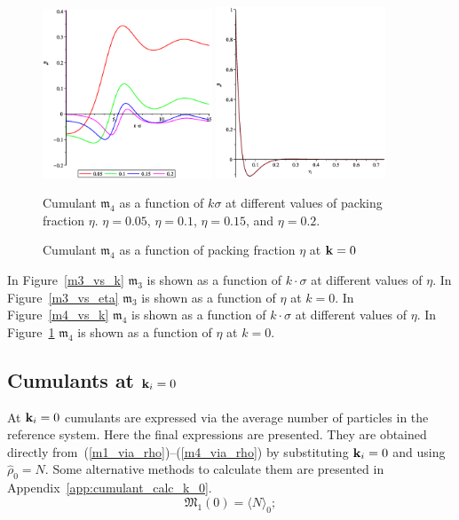 \begin{figure}[htbp]
	\includegraphics[width=0.45\textwidth,angle=0]{M4_as_function_of_k_at_different_eta} \hfill
	\includegraphics[width=0.45\textwidth,angle=0]{M4_as_function_of_eta_at_k_equals_0} \\
	\parbox{0.5\textwidth}{\caption{\label{m4_vs_k} Cumulant $\mathfrak{m}_4$ as a function of $k\sigma$ at different values of packing fraction $\eta$. $\eta = 0.05$, $\eta=0.1$, $\eta = 0.15$, and $\eta=0.2$.
	}} \hfill
	\parbox{0.45\textwidth}{\caption{\label{m4_vs_eta} Cumulant $\mathfrak{m}_4$ as a function of packing fraction $\eta$ at $\vb k = 0$
	}}
\end{figure}
In Figure~\ref{m3_vs_k} $\mathfrak{m}_3$ is shown as a function of $k\cdot\sigma$ at different values of $\eta$. In Figure~\ref{m3_vs_eta} $\mathfrak{m}_3$ is shown as a function of $\eta$ at $k=0$.
In Figure~\ref{m4_vs_k} $\mathfrak{m}_4$ is shown as a function of $k\cdot\sigma$ at different values of $\eta$. In Figure~\ref{m4_vs_eta} $\mathfrak{m}_4$ is shown as a function of $\eta$ at $k=0$.

\subsection{Cumulants at $\vb k_i = 0$}
At $\vb k_i = 0$ cumulants are expressed via the average number of particles in the reference system.
Here the final expressions are presented. They are obtained directly from~(\ref{m1_via_rho})--(\ref{m4_via_rho}) by substituting $\vb k_i=0$ and using $\hat{\rho}_0 = N$. Some alternative methods to calculate them are presented in Appendix~\ref{app:cumulant_calc_k_0}.
\begin{equation}
	\mathfrak{M}_1(0) = \langle N \rangle_0;
\end{equation}

